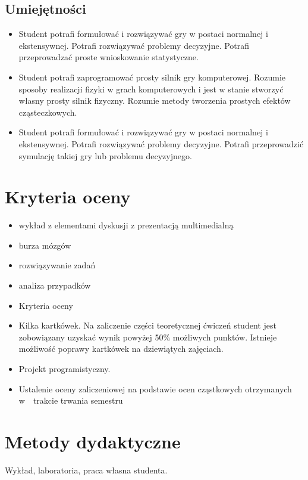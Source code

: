 \documentclass[12pt, a4paper]{article}
\begin{document}
\subsection*{Umiejętności}
\begin{itemize}
  \item Student potrafi formułować i  rozwiązywać gry w postaci normalnej i ekstensywnej. Potrafi rozwiązywać problemy decyzyjne.  Potrafi przeprowadzać proste wnioskowanie statystyczne.
  \item Student potrafi zaprogramować prosty silnik gry komputerowej. Rozumie sposoby realizacji fizyki w grach komputerowych i jest w stanie stworzyć własny prosty silnik fizyczny. Rozumie metody tworzenia prostych efektów cząsteczkowych.
  \item Student potrafi formułować i  rozwiązywać gry w postaci normalnej i ekstensywnej. Potrafi rozwiązywać problemy decyzyjne. Potrafi przeprowadzić symulację takiej gry lub problemu decyzyjnego.
\end{itemize}

\section{Kryteria oceny}

\begin{itemize}
  \item wykład z elementami dyskusji z prezentacją multimedialną
  \item burza mózgów
  \item rozwiązywanie zadań
  \item analiza przypadków
  \item Kryteria oceny
  \item Kilka kartkówek. Na zaliczenie części teoretycznej ćwiczeń student jest zobowiązany uzyskać wynik powyżej 50\% możliwych punktów.  Istnieje możliwość poprawy kartkówek na dziewiątych zajęciach.
  \item Projekt programistyczny.
  \item Ustalenie oceny zaliczeniowej na podstawie ocen cząstkowych otrzymanych w  trakcie trwania semestru
\end{itemize}

\section{Metody dydaktyczne}

Wykład, laboratoria, praca własna studenta.
\end{document}
